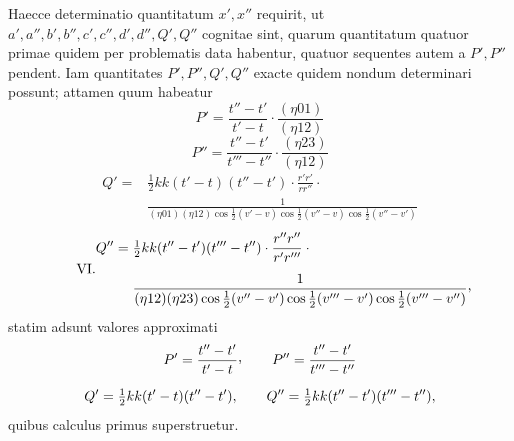 Haecce determinatio quantitatum $x',x''$ requirit, ut\newline $a',a'',b',b'',c',c'',d',d'',Q',Q''$ cognitae sint, quarum quantitatum quatuor primae quidem per problematis data habentur, quatuor sequentes autem a $P',P''$ pendent. Iam quantitates $P',P'',Q',Q''$ exacte quidem nondum determinari possunt; attamen quum habeatur
\[
\tag*{III.}P'=\frac{t''-t'}{t'-t}\cdot\frac{(\eta01)}{(\eta12)}
\]
\[
\tag*{IV.}P''=\frac{t''-t'}{t'''-t''}\cdot\frac{(\eta23)}{(\eta12)}
\]
\[
\tag*{V.}\begin{aligned}
Q'={}&\tfrac12kk(t'-t)(t''-t')\cdot\frac{r'r'}{rr''}\cdot{}\\[.5em]
&\frac{1}{(\eta01)(\eta12)\cos\tfrac12(v'-v)\cos\tfrac12(v''-v)\cos\tfrac12(v''-v')}
\end{aligned}
\]
\[
\tag*{VI.}\begin{aligned}
Q''={}&\tfrac12kk(t''-t')(t'''-t'')\cdot\frac{r''r''}{r'r'''}\cdot{}\\[.5em]
&\frac{1}{(\eta12)(\eta23)\cos\tfrac12(v''-v')\cos\tfrac12(v'''-v')\cos\tfrac12(v'''-v'')}\mathpunct{\raisebox{.45ex}{,}}
\end{aligned}
\]
statim adsunt valores approximati
\[
\begin{gathered}
P'=\frac{t''-t'}{t'-t}\mathpunct{\raisebox{.45ex}{,}}\qquad P''=\frac{t''-t'}{t'''-t''}\\[.6em]
Q'=\tfrac12kk(t'-t)(t''-t'),\qquad Q''=\tfrac12kk(t''-t')(t'''-t''),
\end{gathered}
\]
quibus calculus primus superstruetur.
